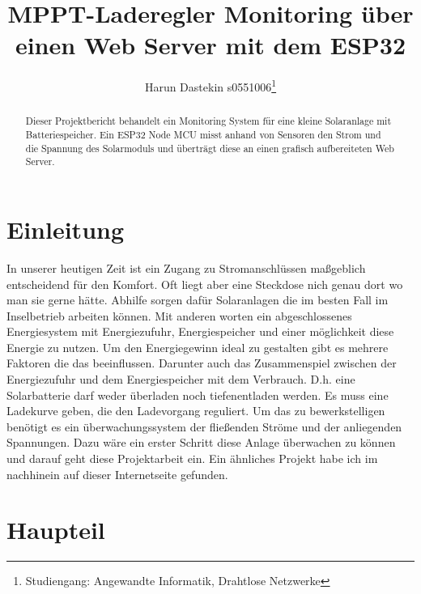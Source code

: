 \documentclass[ngerman]{mucproc}
\begin{document}
	\title{MPPT-Laderegler Monitoring über einen Web Server mit dem ESP32 }
	\author{Harun Dastekin s0551006\thanks[HTW Berlin]{Studiengang: Angewandte Informatik, Drahtlose Netzwerke}}
	
\maketitle

\begin{abstract}
Dieser Projektbericht behandelt ein Monitoring System für eine kleine Solaranlage mit Batteriespeicher. Ein ESP32 Node MCU misst anhand von Sensoren den Strom und die Spannung des Solarmoduls und überträgt diese an einen grafisch aufbereiteten Web Server. 
\end{abstract}	
	
\section{Einleitung}
	In unserer heutigen Zeit ist ein Zugang zu Stromanschlüssen maßgeblich entscheidend für den Komfort. Oft liegt aber eine Steckdose nich genau dort wo man sie gerne hätte. Abhilfe sorgen dafür Solaranlagen die im besten Fall im Inselbetrieb arbeiten können. Mit anderen worten ein abgeschlossenes Energiesystem mit Energiezufuhr, Energiespeicher und einer möglichkeit diese Energie zu nutzen. Um den Energiegewinn ideal zu gestalten gibt es mehrere Faktoren die das beeinflussen. Darunter auch das Zusammenspiel zwischen der Energiezufuhr und dem Energiespeicher mit dem Verbrauch. D.h. eine Solarbatterie darf weder überladen noch tiefenentladen werden. Es muss eine Ladekurve geben, die den Ladevorgang reguliert. Um das zu bewerkstelligen benötigt es ein überwachungssystem der fließenden Ströme und der anliegenden Spannungen. Dazu wäre ein erster Schritt diese Anlage überwachen zu können und darauf geht diese Projektarbeit ein. Ein ähnliches Projekt habe ich im nachhinein auf dieser Internetseite gefunden\parencite{Monitoring.2021}.

\newpage
\section{Haupteil}
\end{document}
